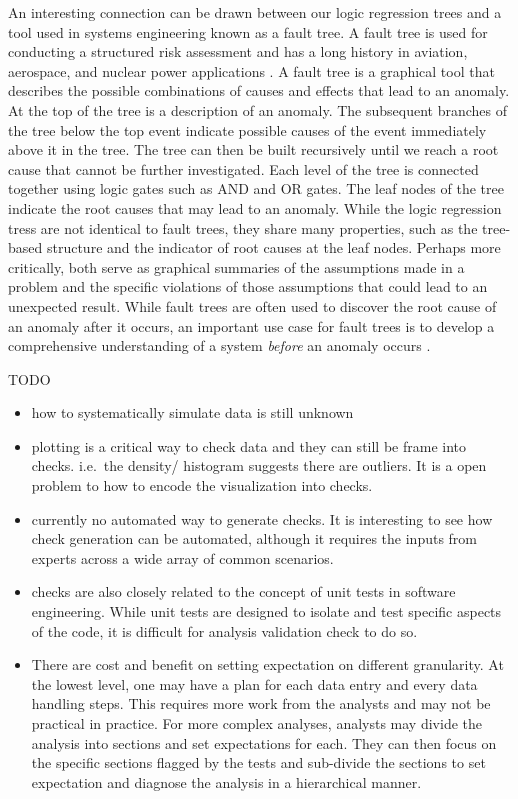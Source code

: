 \documentclass[
  12pt,
]{interact}
\begin{document}
An interesting connection can be drawn between our logic regression
trees and a tool used in systems engineering known as a fault tree. A
fault tree is used for conducting a structured risk assessment and has a
long history in aviation, aerospace, and nuclear power applications
\citep{vesely1981fault}. A fault tree is a graphical tool that describes
the possible combinations of causes and effects that lead to an anomaly.
At the top of the tree is a description of an anomaly. The subsequent
branches of the tree below the top event indicate possible causes of the
event immediately above it in the tree. The tree can then be built
recursively until we reach a root cause that cannot be further
investigated. Each level of the tree is connected together using logic
gates such as AND and OR gates. The leaf nodes of the tree indicate the
root causes that may lead to an anomaly. While the logic regression
tress are not identical to fault trees, they share many properties, such
as the tree-based structure and the indicator of root causes at the leaf
nodes. Perhaps more critically, both serve as graphical summaries of the
assumptions made in a problem and the specific violations of those
assumptions that could lead to an unexpected result. While fault trees
are often used to discover the root cause of an anomaly after it occurs,
an important use case for fault trees is to develop a comprehensive
understanding of a system \emph{before} an anomaly occurs
\citep{michael2002fault}.

TODO

\begin{itemize}
\item
  how to systematically simulate data is still unknown
\item
  plotting is a critical way to check data and they can still be frame
  into checks. i.e.~the density/ histogram suggests there are outliers.
  It is a open problem to how to encode the visualization into checks.
\item
  currently no automated way to generate checks. It is interesting to
  see how check generation can be automated, although it requires the
  inputs from experts across a wide array of common scenarios.
\item
  checks are also closely related to the concept of unit tests in
  software engineering. While unit tests are designed to isolate and
  test specific aspects of the code, it is difficult for analysis
  validation check to do so.
\item
  There are cost and benefit on setting expectation on different
  granularity. At the lowest level, one may have a plan for each data
  entry and every data handling steps. This requires more work from the
  analysts and may not be practical in practice. For more complex
  analyses, analysts may divide the analysis into sections and set
  expectations for each. They can then focus on the specific sections
  flagged by the tests and sub-divide the sections to set expectation
  and diagnose the analysis in a hierarchical manner.
\end{itemize}
\end{document}
